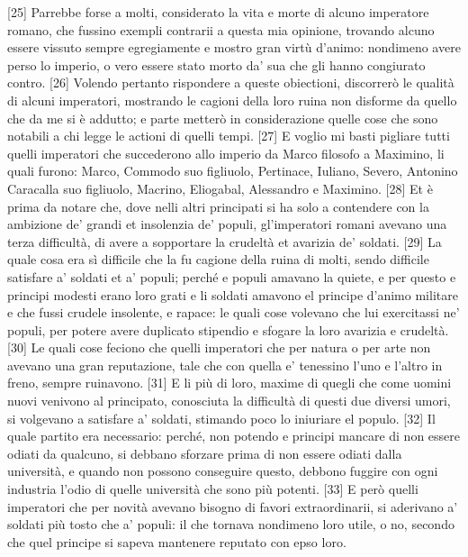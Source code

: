 {[}25{]} Parrebbe forse a molti, considerato la vita e morte di alcuno
imperatore romano, che fussino exempli contrarii a questa mia opinione,
trovando alcuno essere vissuto sempre egregiamente e mostro gran virtù
d'animo: nondimeno avere perso lo imperio, o vero essere stato morto da'
sua che gli hanno congiurato contro. {[}26{]} Volendo pertanto
rispondere a queste obiectioni, discorrerò le qualità di alcuni
imperatori, mostrando le cagioni della loro ruina non disforme da quello
che da me si è addutto; e parte metterò in considerazione quelle cose
che sono notabili a chi legge le actioni di quelli tempi. {[}27{]} E
voglio mi basti pigliare tutti quelli imperatori che succederono allo
imperio da Marco filosofo a Maximino, li quali furono: Marco, Commodo
suo figliuolo, Pertinace, Iuliano, Severo, Antonino Caracalla suo
figliuolo, Macrino, Eliogabal, Alessandro e Maximino. {[}28{]} Et è
prima da notare che, dove nelli altri principati si ha solo a contendere
con la ambizione de' grandi et insolenzia de' populi, gl'imperatori
romani avevano una terza difficultà, di avere a sopportare la crudeltà
et avarizia de' soldati. {[}29{]} La quale cosa era sì difficile che la
fu cagione della ruina di molti, sendo difficile satisfare a' soldati et
a' populi; perché e populi amavano la quiete, e per questo e principi
modesti erano loro grati e li soldati amavono el principe d'animo
militare e che fussi crudele insolente, e rapace: le quali cose volevano
che lui exercitassi ne' populi, per potere avere duplicato stipendio e
sfogare la loro avarizia e crudeltà. {[}30{]} Le quali cose feciono che
quelli imperatori che per natura o per arte non avevano una gran
reputazione, tale che con quella e' tenessino l'uno e l'altro in freno,
sempre ruinavono. {[}31{]} E li più di loro, maxime di quegli che come
uomini nuovi venivono al principato, conosciuta la difficultà di questi
due diversi umori, si volgevano a satisfare a' soldati, stimando poco lo
iniuriare el populo. {[}32{]} Il quale partito era necessario: perché,
non potendo e principi mancare di non essere odiati da qualcuno, si
debbano sforzare prima di non essere odiati dalla università, e quando
non possono conseguire questo, debbono fuggire con ogni industria l'odio
di quelle università che sono più potenti. {[}33{]} E però quelli
imperatori che per novità avevano bisogno di favori extraordinarii, si
aderivano a' soldati più tosto che a' populi: il che tornava nondimeno
loro utile, o no, secondo che quel principe si sapeva mantenere reputato
con epso loro.

